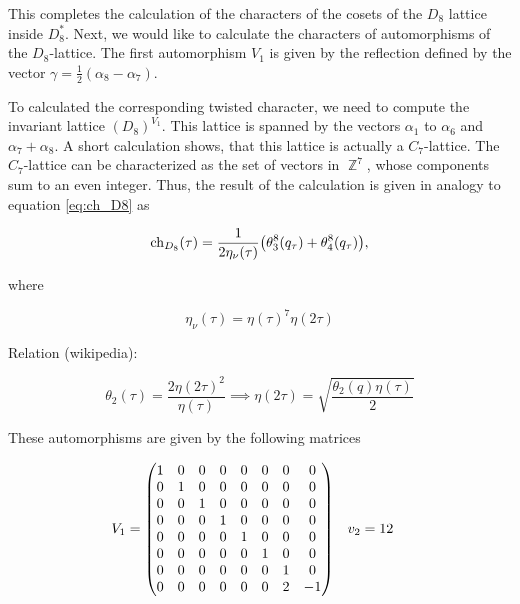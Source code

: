 \documentclass{article}
\DeclareMathOperator{\bbZ}{\mathbb{Z}}
\begin{document}
 This completes the calculation of the characters of the cosets of the $D_8$ lattice inside $D_8^*$. Next, we would like to calculate the characters of automorphisms of the $D_8$-lattice. The first automorphism $V_1$ is given by the reflection defined by the vector $\gamma = \frac{1}{2}(\alpha_8 - \alpha_7)$.
 
 To calculated the corresponding twisted character, we need to compute the invariant lattice $(D_8)^{V_1}$. This lattice is spanned by the vectors $\alpha_1$ to $\alpha_6$ and $\alpha_7 + \alpha_8$. A short calculation shows, that this lattice is actually a $C_7$-lattice. The $C_7$-lattice can be characterized as the set of vectors in $\bbZ^7$, whose components sum to an even integer. Thus, the result of the calculation is given in analogy to equation \eqref{eq:ch_D8} as 
 
 \begin{equation}
     \mathrm{ch}_{D_8}(\tau) = \frac{1}{2 \eta_\nu(\tau)}\qty(\theta_3^8(q_\tau) + \theta_4^8(q_\tau)),
 \end{equation}
 
 where 
 
 \begin{equation}
     \eta_\nu(\tau) = \eta(\tau)^7 \eta(2\tau)
 \end{equation}
 
 Relation (wikipedia):
 
 \begin{equation}
    \theta_2(\tau) = \frac{2 \eta(2\tau)^2}{\eta(\tau)} \implies \eta(2\tau) = \sqrt{\frac{\theta_2(q) \eta(\tau)}{2}}
 \end{equation}
 
 
 
 
 
 
 These automorphisms are given by the following matrices 
 
 \begin{align}
     V_1 &= \mqty(1 & 0 & 0 & 0 & 0 & 0 & 0 & 0\\
     0 & 1 & 0 & 0 & 0 & 0 & 0 & 0\\
     0 & 0 & 1 & 0 & 0 & 0 & 0 & 0\\
     0 & 0 & 0 & 1 & 0 & 0 & 0 & 0\\
     0 & 0 & 0 & 0 & 1 & 0 & 0 & 0\\
     0 & 0 & 0 & 0 & 0 & 1 & 0 & 0\\
     0 & 0 & 0 & 0 & 0 & 0 & 1 & 0\\
     0 & 0 & 0 & 0 & 0 & 0 & 2 & -1\\)& 
     v_2&=12
 \end{align}
 
\end{document}
